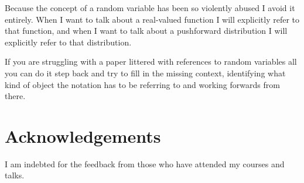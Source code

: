 \documentclass[]{article}
\begin{document}
Because the concept of a random variable has been so violently abused I
avoid it entirely. When I want to talk about a real-valued function I
will explicitly refer to that function, and when I want to talk about a
pushforward distribution I will explicitly refer to that distribution.

If you are struggling with a paper littered with references to random
variables all you can do it step back and try to fill in the missing
context, identifying what kind of object the notation has to be
referring to and working forwards from there.

\hypertarget{acknowledgements}{%
\section*{Acknowledgements}\label{acknowledgements}}

I am indebted for the feedback from those who have attended my courses
and talks.
\end{document}
